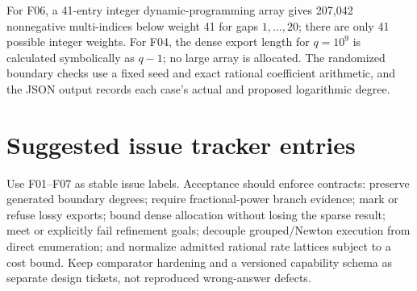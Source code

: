 \documentclass[11pt,letterpaper]{article}
\begin{document}
For F06, a 41-entry integer dynamic-programming array gives 207,042 nonnegative multi-indices below weight 41 for gaps $1,\ldots,20$; there are only 41 possible integer weights. For F04, the dense export length for $q=10^9$ is calculated symbolically as $q-1$; no large array is allocated. The randomized boundary checks use a fixed seed and exact rational coefficient arithmetic, and the JSON output records each case's actual and proposed logarithmic degree.

\section{Suggested issue tracker entries}
Use F01--F07 as stable issue labels. Acceptance should enforce contracts: preserve generated boundary degrees; require fractional-power branch evidence; mark or refuse lossy exports; bound dense allocation without losing the sparse result; meet or explicitly fail refinement goals; decouple grouped/Newton execution from direct enumeration; and normalize admitted rational rate lattices subject to a cost bound. Keep comparator hardening and a versioned capability schema as separate design tickets, not reproduced wrong-answer defects.
\end{document}
